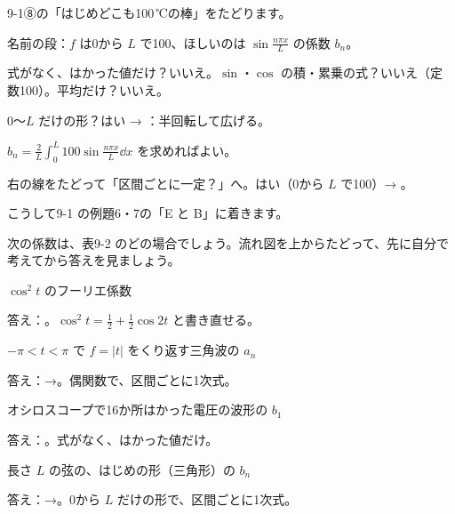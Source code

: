 \begin{bkfigure}
\label{bk:9-2:fig-flow}
\end{bkfigure}

9-1⑧の「はじめどこも100\,℃の棒」をたどります。
\begin{enumerate}[label={\bkcircled[\bkTT]{\arabic*}}, leftmargin=2.4\zw, itemsep=1pt, topsep=2pt]
\item 名前の段：$f$ は0から $L$ で100、ほしいのは $\sin\frac{n\pi x}{L}$ の係数 $b_n$。
\item 式がなく、はかった値だけ？\enspace いいえ。\enspace $\sin$・$\cos$ の積・累乗の式？\enspace いいえ（定数100）。\enspace 平均だけ？\enspace いいえ。
\item 0〜$L$ だけの形？\enspace はい → ：半回転して広げる。\par\nobreak\noindent $b_n=\frac{2}{L}\int_0^L100\sin\frac{n\pi x}{L}\dd x$ を求めればよい。
\item 右の線をたどって「区間ごとに一定？」へ。\enspace はい（0から $L$ で100）→ 。
\end{enumerate}
こうして9-1 の例題6・7の「E と B」に着きます。

次の係数は、表9-2 のどの場合でしょう。流れ図を上からたどって、先に自分で考えてから答えを見ましょう。
\begin{enumerate}[label={\bkcircled[\bkTT]{\arabic*}}, leftmargin=2.4\zw, itemsep=3pt, topsep=2pt]
\item $\cos^2t$ のフーリエ係数\par\nobreak\noindent 答え：。$\cos^2t=\frac12+\frac12\cos2t$ と書き直せる。
\item $-\pi<t<\pi$ で $f=|t|$ をくり返す三角波の $a_n$\par\nobreak\noindent 答え：→。偶関数で、区間ごとに1次式。
\item オシロスコープで16か所はかった電圧の波形の $b_1$\par\nobreak\noindent 答え：。式がなく、はかった値だけ。
\item 長さ $L$ の弦の、はじめの形（三角形）の $b_n$\par\nobreak\noindent 答え：→。0から $L$ だけの形で、区間ごとに1次式。
\end{enumerate}

